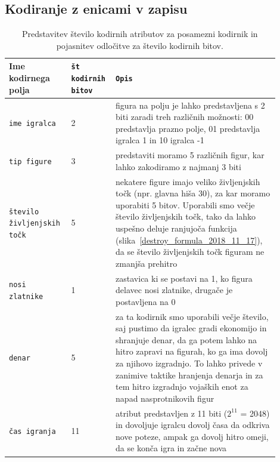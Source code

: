 \documentclass[a4paper, 12pt]{book}
\begin{document}
\subsection{Kodiranje z enicami v zapisu}
\label{oneHotEncoder}
\begin{table}
	\begin{center}
		\begin{tabular}{p{0.19\linewidth}|p{0.13\linewidth}|p{0.58\linewidth}}
			Ime kodirnega polja                        & {\tt št kodirnih bitov} & {\tt Opis} \\ \hline
			{\tt ime igralca}                          & 2                       & figura na polju je lahko predstavljena s 2 biti zaradi treh različnih možnosti: 00 predstavlja prazno polje, 01 predstavlja igralca 1 in 10 igralca -1 \\
			{\tt tip figure}                           & 3                       & predstaviti moramo 5 različnih figur, kar lahko zakodiramo z najmanj 3 biti\\
			{\tt število življenjskih točk}            & 5                       & nekatere figure imajo veliko življenjskih točk (npr. glavna hiša 30), za kar moramo uporabiti 5 bitov. 
																                   Uporabili smo večje število življenjskih točk, tako da lahko uspešno deluje ranjujoča funkcija (slika~\ref{destroy_formula_2018_11_17}), da se število življenjskih točk figuram ne zmanjša prehitro \\
			{\tt nosi zlatnike}                        & 1                       & zastavica ki se postavi na 1, ko figura delavec nosi zlatnike, drugače je postavljena na 0 \\
			{\tt denar}                                & 5                       & za ta kodirnik smo uporabili večje število, saj pustimo da igralec gradi ekonomijo in shranjuje denar, da ga potem lahko na hitro zapravi na figurah, ko ga ima dovolj za njihovo izgradnjo.
																                   To lahko privede v zanimive taktike hranjenja denarja in za tem hitro izgradnjo vojaških enot za napad nasprotnikovih figur \\
			{\tt čas igranja}                          & 11                      & atribut predstavljen z 11 biti ($2^{11}$ = 2048) in dovoljuje igralcu dovolj časa da odkriva nove poteze, ampak ga dovolj hitro omeji, da se konča igra in začne nova \\
		\end{tabular}
	\end{center}
	\caption{Predstavitev število kodirnih atributov za posamezni kodirnik in pojasnitev odločitve za število kodirnih bitov. }
	\label{tableEncodersOneHot}
\end{table}
\end{document}
